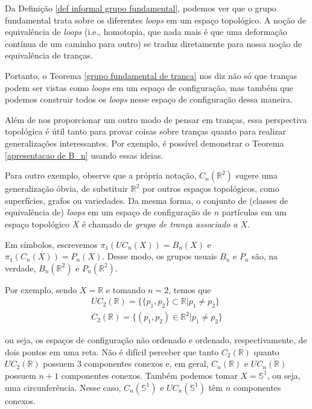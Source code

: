 \documentclass[a4paper,portuguese,11pt,twoside, leqno]{book}
\theoremstyle{definition}
\begin{document}
	\par\vspace{0.3cm} Da Definição \eqref{def informal grupo fundamental}, podemos ver que o grupo fundamental trata sobre os diferentes \textit{loops} em um espaço topológico. A noção de equivalência de \textit{loops} (i.e., homotopia, que nada mais é que uma deformação contínua de um caminho para outro) se traduz diretamente para nossa noção de equivalência de tranças.
	\par\vspace{0.3cm} Portanto, o Teorema \eqref{grupo fundamental de tranca} nos diz não só que tranças podem ser vistas como \textit{loops} em um espaço de configuração, mas também que podemos construir todos os \textit{loops} nesse espaço de configuração dessa maneira.
	\par\vspace{0.3cm} Além de nos proporcionar um outro modo de pensar em tranças, essa perspectiva topológica é útil tanto para provar coisas sobre tranças quanto para realizar generalizações interessantes. Por exemplo, é possível demonstrar o Teorema \eqref{apresentacao de B_n} usando essas ideias. 
	\par\vspace{0.3cm} Para outro exemplo, observe que a própria notação, $C_n(\mathbb{R}^2)$ sugere uma generalização óbvia, de substituir $\mathbb{R}^2$ por outros espaços topológicos, como superfícies, grafos ou variedades. Da mesma forma, o conjunto de (classes de equivalência de) \textit{loops} em um espaço de configuração de $n$ partículas em um espaço topológico $X$ é chamado de \textit{grupo de trança associado a $X$}.
	\par\vspace{0.3cm} Em símbolos, escrevemos $\pi_1(UC_n(X)) = B_n(X)$ e $\pi_1(C_n(X)) = P_n(X)$. Desse modo, os grupos usuais $B_n$ e $P_n$ são, na verdade, $B_n(\mathbb{R}^2)$ e $P_n(\mathbb{R}^2)$.
	\par\vspace{0.3cm} Por exemplo, sendo $X = \mathbb{R}$ e tomando $n=2$, temos que
	\begin{align*}
	UC_2(\mathbb{R}) = \big\{  \{p_1,p_2\}\subset\mathbb{R}|p_1\neq p_2  \big\} \\
	C_2(\mathbb{R}) = \big\{ (p_1,p_2)\in\mathbb{R}^2|p_1\neq p_2 \big\}
	\end{align*}
	\par\vspace{0.3cm} ou seja, os espaços de configuração não ordenado e ordenado, respectivamente, de dois pontos em uma reta. Não é difícil perceber que tanto $C_2(\mathbb{R})$ quanto $UC_2(\mathbb{R})$ possuem 3 componentes conexos e, em geral, $C_n(\mathbb{R})$ e $UC_n(\mathbb{R})$ possuem $n+1$ componentes conexos. Também podemos tomar $X = \mathbb{S}^1$, ou seja, uma circunferência. Nesse caso, $C_n(\mathbb{S}^1)$ e $UC_n(\mathbb{S}^1)$ têm $n$ componentes conexos.
\end{document}
